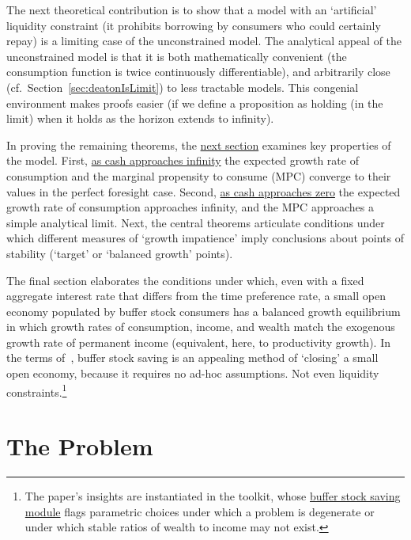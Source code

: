 \documentclass[BufferStockTheory]{subfiles}
\begin{document}
The next theoretical contribution is to show that a model with an `artificial' liquidity constraint (it prohibits borrowing by consumers who could certainly repay) is a limiting case of the unconstrained model.  The analytical appeal of the unconstrained model is that it is both mathematically convenient (the consumption function is twice continuously differentiable), and arbitrarily close (cf.\ Section~\ref{sec:deatonIsLimit}) to less tractable models. This congenial environment makes proofs easier (if we define a proposition as holding (in the limit) when it holds as the horizon extends to infinity).

In proving the remaining theorems, the \hyperlink{AnalysisoftheConvergedConsumptionFunction}{next section} examines key properties of the model. First, \hyperlink{LimitsAsmtToInfty}{as cash approaches infinity} the expected growth rate of consumption and the marginal propensity to consume (MPC) converge to their values in the perfect foresight case. Second, \hyperlink{LimitsAsmtToZero}{as cash approaches zero} the expected growth rate of consumption approaches infinity, and the MPC approaches a simple analytical limit.  Next, the central theorems articulate conditions under which different measures of `growth impatience' imply conclusions about points of stability (`target' or `balanced growth' points).

The final section elaborates the conditions under which, even with a fixed aggregate interest rate that differs from the time preference rate, a small open economy populated by buffer stock consumers has a balanced growth equilibrium in which growth rates of consumption, income, and wealth match the exogenous growth rate of permanent income (equivalent, here, to productivity growth). In the terms of~\cite{schmitt2003closing}, buffer stock saving is an appealing method of `closing' a small open economy, because it requires no ad-hoc assumptions.  Not even liquidity constraints.\footnote{The paper's insights are instantiated in the {\ARKurl} toolkit, whose \href{https://hark.readthedocs.io/en/stable/reference/ConsumptionSaving/ConsIndShockModel.html}{buffer stock saving module} flags parametric choices under which a problem is degenerate or under which stable ratios of wealth to income may not exist.}


\hypertarget{The-Problem}{}
\section{The Problem}
\end{document}

